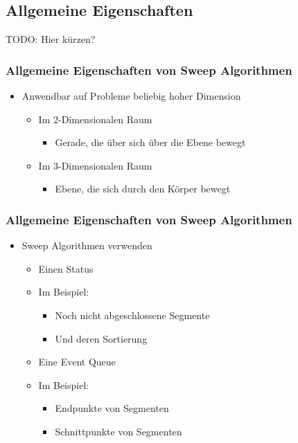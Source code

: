 \subsection{Allgemeine Eigenschaften}
\begin{frame}
TODO: Hier k\"urzen?
	\frametitle{{Allgemeine Eigenschaften von Sweep Algorithmen}}
	\begin{itemize}
		\item Anwendbar auf Probleme beliebig hoher Dimension
		\begin{itemize}
			\pause
			\item{Im 2-Dimensionalen Raum}
			\begin{itemize}
				\item{Gerade, die \"uber sich über die Ebene bewegt}
			\end{itemize}
			\pause
			\item{Im 3-Dimensionalen Raum}
			\begin{itemize}
				\item{Ebene, die sich durch den K\"orper bewegt}
			\end{itemize}
		\end{itemize}
	\end{itemize}
\end{frame}
\begin{frame}
	\frametitle{{Allgemeine Eigenschaften von Sweep Algorithmen}}
	\begin{itemize}
		\item{Sweep Algorithmen verwenden}
		\pause		
		\begin{itemize}
			\item{Einen Status}
			\pause
			\item{Im Beispiel:}
			\begin{itemize}
				\item{Noch nicht abgeschlossene Segmente}
				\pause
				\item{Und deren Sortierung}
			\end{itemize}
			\pause
			\item{Eine Event Queue}
			\pause
			\item{Im Beispiel:}
			\begin{itemize}
				\item{Endpunkte von Segmenten}
				\pause
				\item{Schnittpunkte von Segmenten}
			\end{itemize}
		\end{itemize}
	\end{itemize}
\end{frame}


